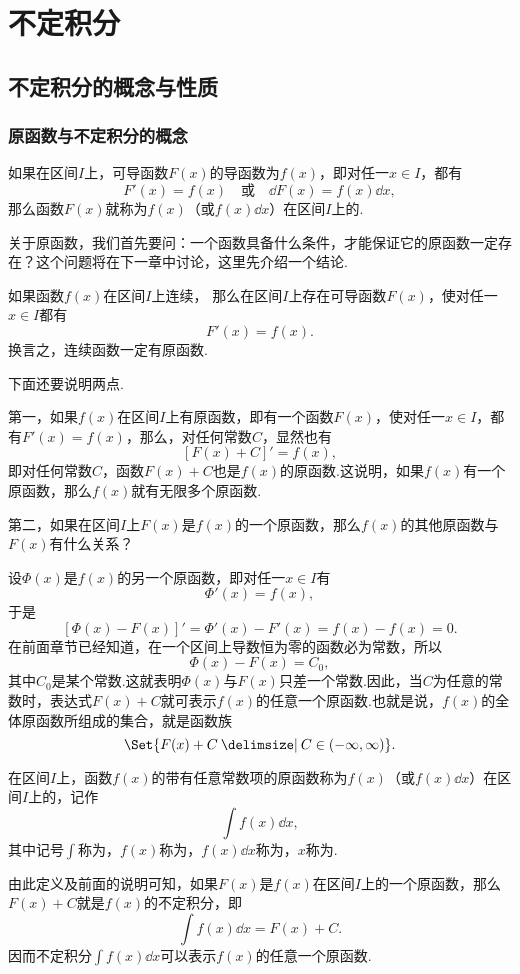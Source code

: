 \chapter{不定积分}\label{chapter:不定积分}
\section{不定积分的概念与性质}
\subsection{原函数与不定积分的概念}
\begin{definition}
如果在区间\(I\)上，可导函数\(F(x)\)的导函数为\(f(x)\)，即对任一\(x \in I\)，都有\[
F'(x)=f(x) \quad\text{或}\quad \dd{F(x)}=f(x) \dd{x},
\]那么函数\(F(x)\)就称为\(f(x)\)（或\(f(x) \dd{x}\)）在区间\(I\)上的.
\end{definition}

关于原函数，我们首先要问：一个函数具备什么条件，才能保证它的原函数一定存在？这个问题将在下一章中讨论，这里先介绍一个结论.
\begin{theorem}[原函数存在定理]%
如果函数\(f(x)\)在区间\(I\)上连续，
那么在区间\(I\)上存在可导函数\(F(x)\)，使对任一\(x \in I\)都有\[
	F'(x)=f(x).
\]
换言之，连续函数一定有原函数.
\end{theorem}
下面还要说明两点.

第一，如果\(f(x)\)在区间\(I\)上有原函数，即有一个函数\(F(x)\)，使对任一\(x \in I\)，都有\(F'(x) = f(x)\)，那么，对任何常数\(C\)，显然也有\[
[F(x) + C]' = f(x),
\]即对任何常数\(C\)，函数\(F(x) + C\)也是\(f(x)\)的原函数.这说明，如果\(f(x)\)有一个原函数，那么\(f(x)\)就有无限多个原函数.

第二，如果在区间\(I\)上\(F(x)\)是\(f(x)\)的一个原函数，那么\(f(x)\)的其他原函数与\(F(x)\)有什么关系？

设\(\Phi(x)\)是\(f(x)\)的另一个原函数，即对任一\(x \in I\)有\[
\Phi'(x) = f(x),
\]于是\[
[\Phi(x) - F(x)]' = \Phi'(x) - F'(x) = f(x) - f(x) = 0.
\]在前面章节已经知道，在一个区间上导数恒为零的函数必为常数，所以\[
\Phi(x) - F(x) = C_0,
\]其中\(C_0\)是某个常数.这就表明\(\Phi(x)\)与\(F(x)\)只差一个常数.因此，当\(C\)为任意的常数时，表达式\(F(x) + C\)就可表示\(f(x)\)的任意一个原函数.也就是说，\(f(x)\)的全体原函数所组成的集合，就是函数族\[
\Set{ F(x) + C \given C \in (-\infty,\infty) }.
\]

\begin{definition}
在区间\(I\)上，函数\(f(x)\)的带有任意常数项的原函数称为\(f(x)\)（或\(f(x) \dd{x}\)）在区间\(I\)上的，记作\[
\int f(x) \dd{x},
\]其中记号\(\int\)称为，\(f(x)\)称为，\(f(x)\dd{x}\)称为，\(x\)称为.
\end{definition}
由此定义及前面的说明可知，如果\(F(x)\)是\(f(x)\)在区间\(I\)上的一个原函数，那么\(F(x) + C\)就是\(f(x)\)的不定积分，即\[
\int f(x) \dd{x} = F(x) + C.
\]
因而不定积分\(\int f(x) \dd{x}\)可以表示\(f(x)\)的任意一个原函数.


